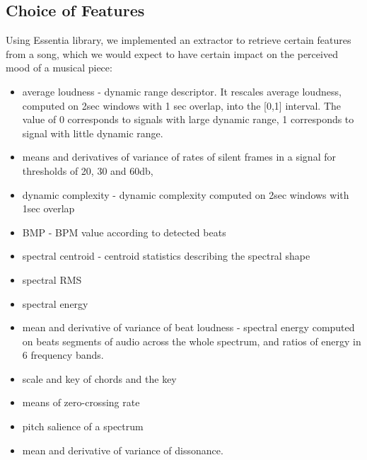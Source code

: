 \subsection{Choice of Features}
Using Essentia library, we implemented an extractor to retrieve certain features from a song, which we would expect to have certain impact on the perceived mood of a musical piece:
\begin{itemize}
\item average loudness - dynamic range descriptor. It rescales average loudness, computed on 2sec windows with 1 sec overlap, into the [0,1] interval. The value of 0 corresponds to signals with large dynamic range, 1 corresponds to signal with little dynamic range. 
\item means and derivatives of variance of rates of silent frames in a signal for thresholds of 20, 30 and 60db,
\item dynamic complexity - dynamic complexity computed on 2sec windows with 1sec overlap
\item BMP - BPM value according to detected beats
\item spectral centroid - centroid statistics describing the spectral shape
\item spectral RMS
\item spectral energy
\item mean and derivative of variance of beat loudness -  spectral energy computed on beats segments of audio across the whole spectrum, and ratios of energy in 6 frequency bands.
\item scale and key of chords and the key
\item means of zero-crossing rate
\item pitch salience of a spectrum
\item mean and derivative of variance of dissonance. 
\end{itemize}

